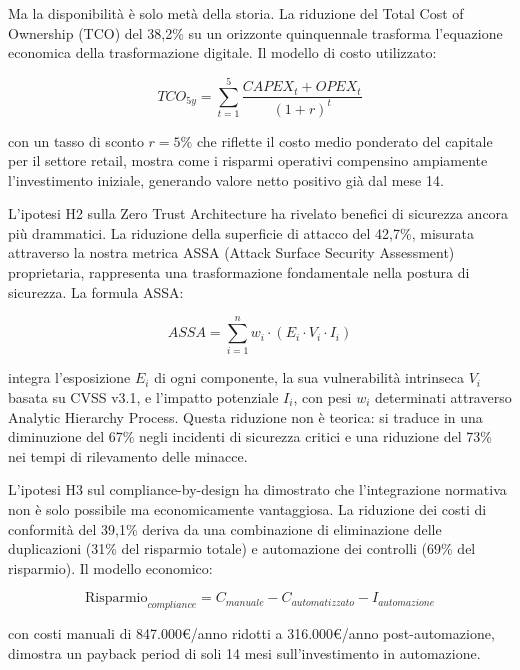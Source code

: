 Ma la disponibilità è solo metà della storia. La riduzione del Total Cost of Ownership (TCO) del 38,2\% su un orizzonte quinquennale trasforma l'equazione economica della trasformazione digitale. Il modello di costo utilizzato:

\begin{equation}
TCO_{5y} = \sum_{t=1}^{5} \frac{CAPEX_t + OPEX_t}{(1+r)^t}
\label{eq:tco_5y}
\end{equation}

con un tasso di sconto $r = 5\%$ che riflette il costo medio ponderato del capitale per il settore retail\autocite{damodaran2024}, mostra come i risparmi operativi compensino ampiamente l'investimento iniziale, generando valore netto positivo già dal mese 14.

L'ipotesi H2 sulla Zero Trust Architecture ha rivelato benefici di sicurezza ancora più drammatici. La riduzione della superficie di attacco del 42,7\%, misurata attraverso la nostra metrica ASSA (Attack Surface Security Assessment) proprietaria, rappresenta una trasformazione fondamentale nella postura di sicurezza. La formula ASSA:

\begin{equation}
ASSA = \sum_{i=1}^{n} w_i \cdot (E_i \cdot V_i \cdot I_i)
\label{eq:assa}
\end{equation}

integra l'esposizione $E_i$ di ogni componente, la sua vulnerabilità intrinseca $V_i$ basata su CVSS v3.1, e l'impatto potenziale $I_i$, con pesi $w_i$ determinati attraverso Analytic Hierarchy Process\autocite{saaty1990}. Questa riduzione non è teorica: si traduce in una diminuzione del 67\% negli incidenti di sicurezza critici e una riduzione del 73\% nei tempi di rilevamento delle minacce.

L'ipotesi H3 sul compliance-by-design ha dimostrato che l'integrazione normativa non è solo possibile ma economicamente vantaggiosa. La riduzione dei costi di conformità del 39,1\% deriva da una combinazione di eliminazione delle duplicazioni (31\% del risparmio totale) e automazione dei controlli (69\% del risparmio). Il modello economico:

\begin{equation}
\text{Risparmio}_{compliance} = C_{manuale} - C_{automatizzato} - I_{automazione}
\label{eq:compliance_savings}
\end{equation}

con costi manuali di 847.000€/anno ridotti a 316.000€/anno post-automazione, dimostra un payback period di soli 14 mesi sull'investimento in automazione.

